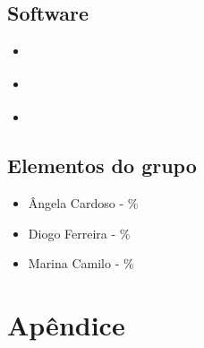 \documentclass[12pt]{report}
\begin{document}
\section{Software}

\begin{itemize}
	\item \href{http://jade.tilab.com}{\jade}
	\item \href{http://repast.sourceforge.net/repast_3/index.html}{\repast}
	\item \href{https://web.fe.up.pt/~hlc/doku.php?id=sajas}{\sajas}
\end{itemize}

\section{Elementos do grupo}
\begin{itemize}
	\item Ângela Cardoso - \%
	\item Diogo Ferreira - \%
	\item Marina Camilo - \%
\end{itemize}


\chapter{Apêndice}

\end{document}
